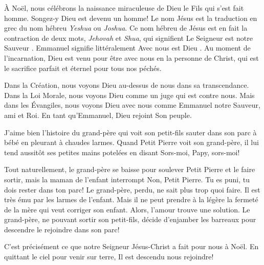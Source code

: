 


À Noël, nous célébrons la naissance miraculeuse de Dieu le Fils qui s'est fait homme. Songez-y\frcolon{} Dieu est devenu un homme! Le nom \Og Jésus \Fg{} est la traduction en grec du nom hébreu \emph{Yeshua} ou \emph{Joshua}. Ce nom hébreu de Jésus est en fait la contraction de deux mots, \emph{Jehovah} et \emph{Shua}, qui signifient \Og Le Seigneur est notre Sauveur \Fg{}. Emmanuel signifie littéralement \Og Avec nous est Dieu \Fg{}. Au moment de l'incarnation, Dieu est venu pour être avec nous en la personne de Christ, qui est le sacrifice parfait et éternel pour tous nos péchés.

Dans la Création, nous voyons Dieu au-dessus de nous dans sa transcendance. Dans la Loi Morale, nous voyons Dieu comme un juge qui est contre nous. Mais dans les Évangiles, nous voyons Dieu avec nous comme Emmanuel \ocadr notre Sauveur, ami et Roi. En tant qu'Emmanuel, Dieu rejoint Son peuple.

J'aime bien l'histoire du grand-père qui voit son petit-fils sauter dans son parc à bébé en pleurant à chaudes larmes. Quand Petit Pierre voit son grand-père, il lui tend aussitôt ses petites mains potelées en disant\frcolon{} \Og Sors-moi, Papy, sors-moi! \Fg{}

Tout naturellement, le grand-père se baisse pour soulever Petit Pierre et le faire sortir, mais la maman de l'enfant interrompt\frcolon{} \Og Non, Petit Pierre. Tu es puni, tu dois rester dans ton parc! \Fg{} Le grand-père, perdu, ne sait plus trop quoi faire. Il est très ému par les larmes de l'enfant. Mais il ne peut prendre à la légère la fermeté de la mère qui veut corriger son enfant. Alors, l'amour trouve une solution. Le grand-père, ne pouvant sortir son petit-fils, décide d'enjamber les barreaux pour descendre le rejoindre dans son parc!

C'est précisément ce que notre Seigneur Jésus-Christ a fait pour nous à Noël. En quittant le ciel pour venir sur terre, Il est descendu nous rejoindre!

\begin{dvquotes}
\end{dvquotes}

